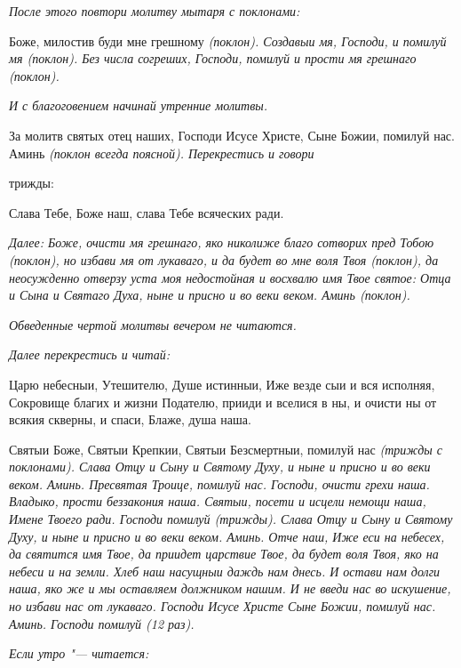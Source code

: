  \itshape После этого повтори молитву мытаря с поклонами:\normalfont{}


   Боже, милостив буди мне грешному \itshape (поклон)\normalfont{}. Создавыи мя, Господи, и
помилуй мя \itshape (поклон)\normalfont{}. Без числа согреших, Господи, помилуй и прости мя
грешнаго \itshape (поклон)\normalfont{}.


 \itshape И с благоговением начинай утренние молитвы.\normalfont{}


   За молитв святых отец наших, Господи Исусе Христе, Сыне Божии,
помилуй нас. Аминь \itshape (поклон всегда поясной). Перекрестись и говори

трижды:\normalfont{}


   Слава Тебе, Боже наш, слава Тебе всяческих ради.


 \itshape Далее:\normalfont{} Боже, очисти мя грешнаго, яко николиже благо сотворих пред
Тобою \itshape (поклон)\normalfont{}, но избави мя от лукаваго, и да будет во мне воля Твоя
\itshape (поклон)\normalfont{}, да неосужденно отверзу уста моя недостойная и восхвалю имя
Твое святое: Отца и Сына и Святаго Духа, ныне и присно и во веки веком.
Аминь \itshape (поклон)\normalfont{}.


 \itshape Обведенные чертой молитвы вечером не читаются.\normalfont{}


 \itshape Далее перекрестись и читай:\normalfont{}


   Царю небесныи, Утешителю, Душе истинныи, Иже везде сыи и вся
исполняя, Сокровище благих и жизни Подателю, прииди и вселися в ны, и
очисти ны от всякия скверны, и спаси, Блаже, душа наша.


   Святыи Боже, Святыи Крепкии, Святыи Безсмертныи, помилуй
нас \itshape (трижды с поклонами)\normalfont{}. Слава Отцу и Сыну и Святому Духу, и
ныне и присно и во веки веком. Аминь. Пресвятая Троице, помилуй
нас. Господи, очисти грехи наша. Владыко, прости беззакония наша.
Святыи, посети и исцели немощи наша, Имене Твоего ради. Господи
помилуй \itshape (трижды)\normalfont{}. Слава Отцу и Сыну и Святому Духу, и ныне и
присно и во веки веком. Аминь. Отче наш, Иже еси на небесех, да
святится имя Твое, да приидет царствие Твое, да будет воля Твоя,
яко на небеси и на земли. Хлеб наш насущныи даждь нам днесь. И
остави нам долги наша, яко же и мы оставляем должником нашим.
И не введи нас во искушение, но избави нас от лукаваго. Господи
Исусе Христе Сыне Божии, помилуй нас. Аминь. Господи помилуй \itshape (12
раз)\normalfont{}.


 \itshape Если утро "--- читается:\normalfont{}


